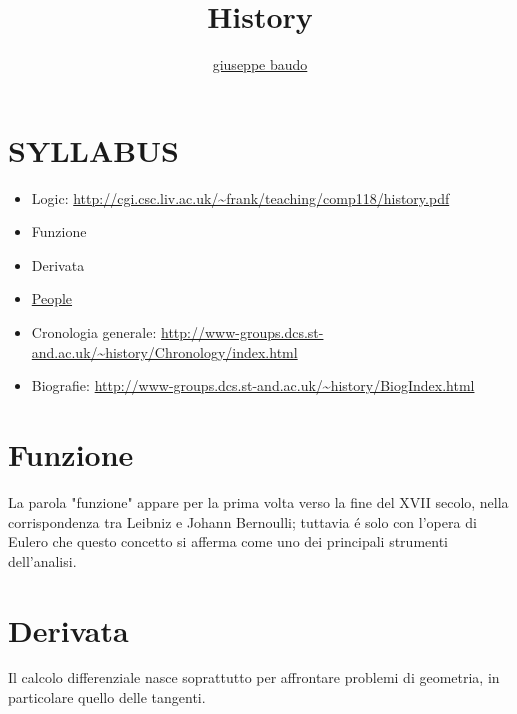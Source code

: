 \documentclass[a4paper,10pt]{article}
\title{History}
\author{\href{http://www.baudo.hol.es}{giuseppe baudo}}
\begin{document}
\maketitle

\section{SYLLABUS}
\begin{itemize}
 \item Logic: \url{http://cgi.csc.liv.ac.uk/~frank/teaching/comp118/history.pdf}
 \item Funzione
 \item Derivata
 \item \href{People.html}{People}
 \item Cronologia generale: \url{http://www-groups.dcs.st-and.ac.uk/~history/Chronology/index.html}
 \item Biografie: \url{http://www-groups.dcs.st-and.ac.uk/~history/BiogIndex.html}
\end{itemize}

\section{Funzione}
La parola "funzione" appare per la prima volta verso la fine del XVII secolo, nella corrispondenza tra Leibniz e Johann Bernoulli; tuttavia \'{e} solo con l'opera di Eulero
che questo concetto si afferma come uno dei principali strumenti dell'analisi.

\section{Derivata}
Il calcolo differenziale nasce soprattutto per affrontare problemi di geometria, in particolare quello delle tangenti.
\end{document}
